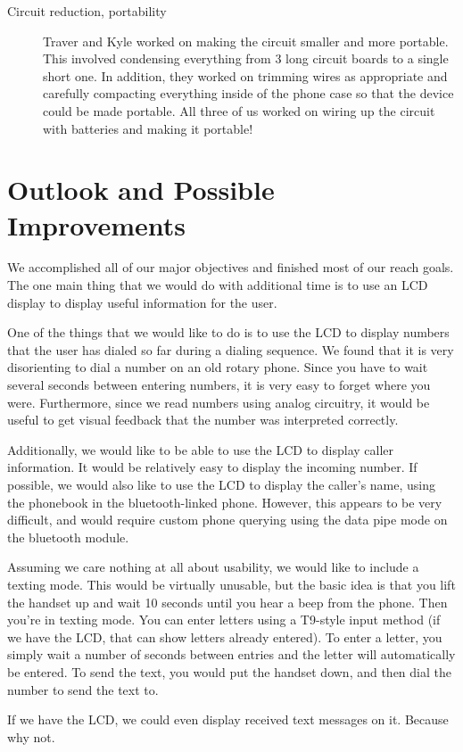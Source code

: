 \documentclass{es50report}
\begin{document}
\begin{description}
            \item[Circuit reduction, portability]
                Traver and Kyle worked on making the circuit smaller and more portable. This involved condensing everything from 3 long circuit boards to a single short one. In addition, they worked on trimming wires as appropriate and carefully compacting everything inside of the phone case so that the device could be made portable. All three of us worked on wiring up the circuit with batteries and making it portable!
        \end{description}

    \section{Outlook and Possible Improvements}
        \begin{description}
            \setlength{\parskip}{2mm}
            \item[LCD display]
                We accomplished all of our major objectives and finished most of our reach goals. The one main thing that we would do with additional time is to use an LCD display to display useful information for the user.

                One of the things that we would like to do is to use  the LCD to display numbers that the user has dialed so far during a dialing sequence. We found that it is very disorienting to dial a number on an old rotary phone. Since you have to wait several seconds between entering numbers, it is very easy to forget where you were. Furthermore, since we read numbers using analog circuitry, it would be useful to get visual feedback that the number was interpreted correctly.

                Additionally, we would like to be able to use the LCD to display caller information. It would be relatively easy to display the incoming number. If possible, we would also like to use the LCD to display the caller's name, using the phonebook in the bluetooth-linked phone. However, this appears to be very difficult, and would require custom phone querying using the data pipe mode on the bluetooth module.
            \item[Texting mode]
                Assuming we care nothing at all about usability, we would like to include a texting mode. This would be virtually unusable, but the basic idea is that you lift the handset up and wait 10 seconds until you hear a beep from the phone. Then you're in texting mode. You can enter letters using a T9-style input method (if we have the LCD, that can show letters already entered). To enter a letter, you simply wait a number of seconds between entries and the letter will automatically be entered. To send the text, you would put the handset down, and then dial the number to send the text to.

                If we have the LCD, we could even display received text messages on it. Because why not.
        \end{description}
\end{document}

